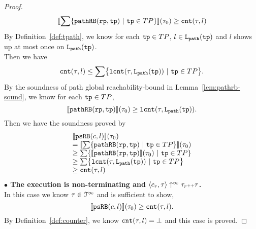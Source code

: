 \begin{proof}
    \[
        \econfig{\sum \left\{ \inoutB(\rprog, \tpath) ~\vert~ \tpath \in TP \right\}}(\trace_0)  
        \geq   \counter(\trace, l)
    \]
    By Definition~\ref{def:tpath}, we know for each $\mathtt{tp} \in TP$, $l \in \mathtt{L}_{\mathtt{path}}(\mathtt{tp})$ and $l$ shows up at most once on $\mathtt{L}_{\mathtt{path}}(\mathtt{tp})$. 
    \\
    Then we have
    \[
    \counter(\trace, l) \leq \sum\left\{ \lcounter(\trace, \pathl(\tpath)) ~\vert~ \tpath \in TP \right\}.
    \]
    By the soundness of path global reachability-bound in Lemma~\ref{lem:pathrb-sound}, we know for each $\mathtt{tp} \in TP$,
    \[
        \llbracket \mathtt{pathRB}(\mathtt{rp}, \mathtt{tp}) \rrbracket(\mathtt{\tau}_0)  \geq  \mathtt{lcnt}(\mathtt{\tau}, \mathtt{L}_{\mathtt{path}}(\mathtt{tp})).
    \]
    Then we have the soundness proved by
    \[
        \begin{array}{l}
        \econfig{\psRB(c, l)}(\trace_0) 
        \\ =
        \econfig{\sum \left\{ \inoutB(\rprog, \tpath) ~\vert~ \tpath \in TP \right\}}(\trace_0) 
        \\ \geq 
        \sum\left\{ \econfig{\inoutB(\rprog, \tpath)}(\trace_0) ~\vert~ \tpath \in TP \right\}
        \\ \geq 
        \sum\left\{ \lcounter(\trace, \pathl(\tpath)) ~\vert~ \tpath \in TP \right\}
        \\ \geq \counter(\trace, l)
        \end{array}
    \]
    \textbf{$\bullet$ The execution is non-terminating and {$\langle {c_r}, \mathtt{\tau} \rangle \uparrow^{\infty} \mathtt{\tau}_r {\scriptscriptstyle ++} \mathtt{\tau}$}.} 
    \\
     In this case we know $\mathtt{\tau} \in \mathcal{T}^{\infty}$ and is sufficient to show,
    \[
      \llbracket \mathtt{psRB}(c, l) \rrbracket(\mathtt{\tau}_0) \geq \mathtt{cnt}(\mathtt{\tau}, l).
    \]
    By Definition~\ref{def:counter}, we know $\mathtt{cnt}(\mathtt{\tau}, l) = \bot$ and this case is proved.
    \end{proof}
  
